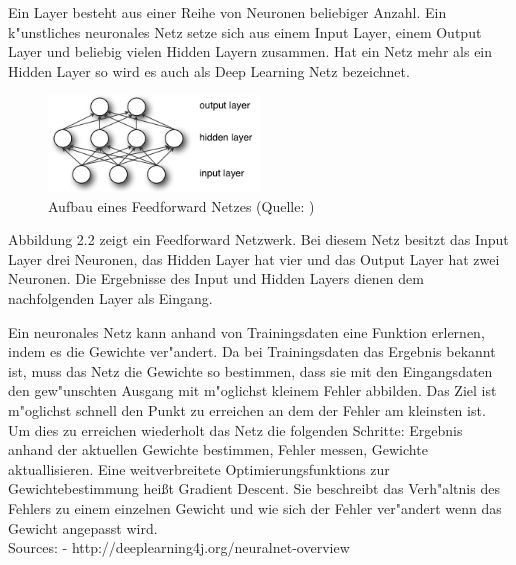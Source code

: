 {Ein Layer besteht aus einer Reihe von Neuronen beliebiger Anzahl. Ein k"unstliches neuronales Netz setze sich aus einem Input Layer, einem Output Layer und beliebig vielen Hidden Layern zusammen. Hat ein Netz mehr als ein Hidden Layer so wird es auch als Deep Learning Netz bezeichnet.
\renewcommand{\figurename}{Abb.}
\begin{figure}[htp]
\centering
\includegraphics[width=0.50\textwidth]{pictures/mlp.png}
\caption[Aufbau eines Feedforward Netzes]{Aufbau eines Feedforward Netzes (Quelle: \cite{FNet})} 
\end{figure}
Abbildung 2.2 zeigt ein Feedforward Netzwerk. Bei diesem Netz besitzt das Input Layer drei Neuronen, das Hidden Layer hat vier und das Output Layer hat zwei Neuronen. Die Ergebnisse des Input und Hidden Layers dienen dem nachfolgenden Layer als Eingang.

Ein neuronales Netz kann anhand von Trainingsdaten eine Funktion erlernen, indem es die Gewichte ver"andert. Da bei Trainingsdaten das Ergebnis bekannt ist, muss das Netz die Gewichte so bestimmen, dass sie mit den Eingangsdaten den gew"unschten Ausgang mit m"oglichst kleinem Fehler abbilden. Das Ziel ist m"oglichst schnell den Punkt zu erreichen an dem der Fehler am kleinsten ist. Um dies zu erreichen wiederholt das Netz die folgenden Schritte: Ergebnis anhand der aktuellen Gewichte bestimmen, Fehler messen, Gewichte aktuallisieren.
Eine weitverbreitete Optimierungsfunktions zur Gewichtebestimmung hei{\ss}t Gradient Descent. Sie beschreibt das Verh"altnis des Fehlers zu einem einzelnen Gewicht und wie sich der Fehler ver"andert wenn das Gewicht angepasst wird.\\
Sources: - http://deeplearning4j.org/neuralnet-overview


}
